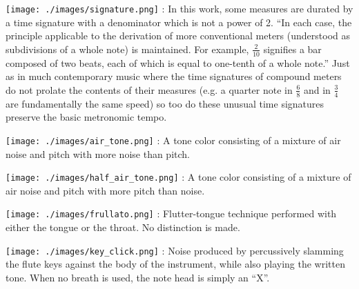 \documentclass[11pt]{article}
\begin{document}
\begin{multicols}{2}

\texttt{[image: ./images/signature.png]}  : In this work, some measures are durated by a time signature with a denominator which is not a power of 2. ``In each case, the principle applicable to the derivation of more conventional meters (understood as subdivisions of a whole note) is maintained. For example, $\frac{2}{10}$ signifies a bar composed of two beats, each of which is equal to one-tenth of a whole note.'' Just as in much contemporary music where the time signatures of compound meters do not prolate the contents of their measures (e.g. a quarter note in $\frac{6}{8}$ and in $\frac{3}{4}$ are fundamentally the same speed) so too do these unusual time signatures preserve the basic metronomic tempo. \\
\rightskip\leftskip
\phantom{text} \hfill \phantom{()}


\vspace*{0.25cm}

\texttt{[image: ./images/air\_tone.png]}  : A tone color consisting of a mixture of air noise and pitch with more noise than pitch. \\
\rightskip\leftskip
\phantom{text} \hfill \phantom{()}


\vspace*{0.25cm}

\texttt{[image: ./images/half\_air\_tone.png]}  : A tone color consisting of a mixture of air noise and pitch with more pitch than noise. \\
\rightskip\leftskip
\phantom{text} \hfill \phantom{()}


\vspace*{0.25cm}

\texttt{[image: ./images/frullato.png]}  : Flutter-tongue technique performed with either the tongue or the throat. No distinction is made. \\
\rightskip\leftskip
\phantom{text} \hfill \phantom{()}


\vspace*{0.25cm}

\texttt{[image: ./images/key\_click.png]}  : Noise produced by percussively slamming the flute keys against the body of the instrument, while also playing the written tone. When no breath is used, the note head is simply an ``X''. \\
\rightskip\leftskip
\phantom{text} \hfill \phantom{()}


\end{multicols}
\end{document}
